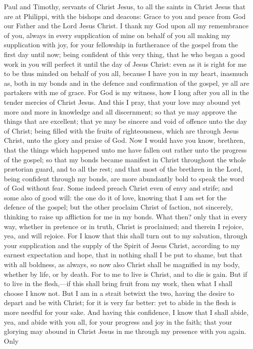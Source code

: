


Paul and Timothy, servants of Christ Jesus, to all the saints in Christ Jesus that are at Philippi, with the bishops and deacons: Grace to you and peace from God our Father and the Lord Jesus Christ.  I thank my God upon all my remembrance of you, always in every supplication of mine on behalf of you all making my supplication with joy, for your fellowship in furtherance of the gospel from the first day until now; being confident of this very thing, that he who began a good work in you will perfect it until the day of Jesus Christ: even as it is right for me to be thus minded on behalf of you all, because I have you in my heart, inasmuch as, both in my bonds and in the defence and confirmation of the gospel, ye all are partakers with me of grace. For God is my witness, how I long after you all in the tender mercies of Christ Jesus. And this I pray, that your love may abound yet more and more in knowledge and all discernment; so that ye may approve the things that are excellent; that ye may be sincere and void of offence unto the day of Christ; being filled with the fruits of righteousness, which are through Jesus Christ, unto the glory and praise of God.  Now I would have you know, brethren, that the things which happened unto me have fallen out rather unto the progress of the gospel; so that my bonds became manifest in Christ throughout the whole prætorian guard, and to all the rest; and that most of the brethren in the Lord, being confident through my bonds, are more abundantly bold to speak the word of God without fear. Some indeed preach Christ even of envy and strife; and some also of good will: the one do it of love, knowing that I am set for the defence of the gospel; but the other proclaim Christ of faction, not sincerely, thinking to raise up affliction for me in my bonds. What then? only that in every way, whether in pretence or in truth, Christ is proclaimed; and therein I rejoice, yea, and will rejoice. For I know that this shall turn out to my salvation, through your supplication and the supply of the Spirit of Jesus Christ, according to my earnest expectation and hope, that in nothing shall I be put to shame, but that with all boldness, as always, so now also Christ shall be magnified in my body, whether by life, or by death. For to me to live is Christ, and to die is gain. But if to live in the flesh,—if this shall bring fruit from my work, then what I shall choose I know not. But I am in a strait betwixt the two, having the desire to depart and be with Christ; for it is very far better: yet to abide in the flesh is more needful for your sake. And having this confidence, I know that I shall abide, yea, and abide with you all, for your progress and joy in the faith; that your glorying may abound in Christ Jesus in me through my presence with you again. Only 